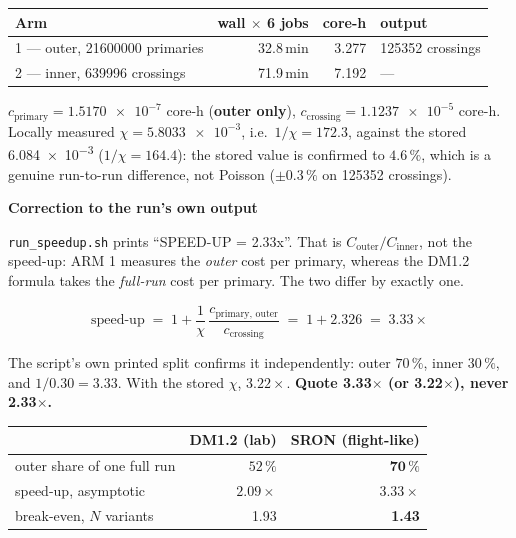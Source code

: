 \documentclass[11pt,a4paper]{article}
\newenvironment{callout}[3]%
{\par\medskip\noindent
 \def\calloutframe{#1}\def\calloutback{#2}%
 \setlength{\fboxrule}{0.9pt}\setlength{\fboxsep}{8pt}%
 \begin{lrbox}{\calloutbox}%
 \begin{minipage}{\dimexpr\textwidth-2\fboxsep-2\fboxrule\relax}%
 \setlength{\parskip}{4pt}%
 \textcolor{#1}{\textbf{#3}}\par\nobreak\smallskip}
{\end{minipage}\end{lrbox}%
 \fcolorbox{\calloutframe}{\calloutback}{\usebox{\calloutbox}}%
 \par\medskip}
\begin{document}
\begin{center}
\begin{tabular}{lrrl}
\toprule
Arm & wall $\times$ 6 jobs & core-h & output \\
\midrule
1 --- outer, \num{21600000} primaries & 32.8\,min & 3.277
  & \num{125352} crossings \\
2 --- inner, \num{639996} crossings   & 71.9\,min & 7.192 & --- \\
\bottomrule
\end{tabular}
\end{center}

$c_{\mathrm{primary}} = \num{1.5170e-7}$ core-h (\textbf{outer only}),
$c_{\mathrm{crossing}} = \num{1.1237e-5}$ core-h. Locally measured
$\chi = \num{5.8033e-3}$, i.e.\ $1/\chi = 172.3$, against the stored
\num{6.084e-3} ($1/\chi = 164.4$): the stored value is confirmed to
$4.6\,\%$, which is a genuine run-to-run difference, not Poisson
($\pm0.3\,\%$ on \num{125352} crossings).

\begin{callout}{warn}{red!4}{Correction to the run's own output}
\texttt{run\_speedup.sh} prints ``SPEED-UP = 2.33x''. That is
$C_{\mathrm{outer}}/C_{\mathrm{inner}}$, not the speed-up: ARM 1 measures the
\emph{outer} cost per primary, whereas the DM1.2 formula takes the
\emph{full-run} cost per primary. The two differ by exactly one.

\[
  \text{speed-up} \;=\; 1 + \frac{1}{\chi}\,
  \frac{c_{\mathrm{primary,\,outer}}}{c_{\mathrm{crossing}}}
  \;=\; 1 + 2.326 \;=\; \mathbf{3.33\times}
\]

The script's own printed split confirms it independently: outer $70\,\%$,
inner $30\,\%$, and $1/0.30 = 3.33$. With the stored $\chi$, $3.22\times$.
\textbf{Quote 3.33$\times$ (or 3.22$\times$), never 2.33$\times$.}
\end{callout}

\begin{center}
\begin{tabular}{lrr}
\toprule
 & DM1.2 (lab) & SRON (flight-like) \\
\midrule
outer share of one full run & $52\,\%$ & $\mathbf{70\,\%}$ \\
speed-up, asymptotic        & $2.09\times$ & $\mathbf{3.33\times}$ \\
break-even, $N$ variants    & 1.93 & \textbf{1.43} \\
\bottomrule
\end{tabular}
\end{center}
\end{document}
